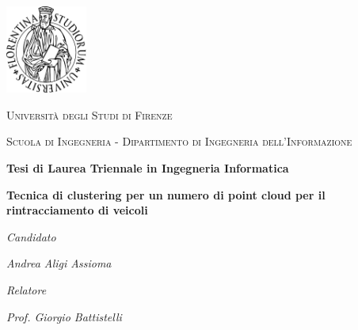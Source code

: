 \documentclass[italian]{report}
\begin{document}
\begin{titlepage}
	\centering
	\includegraphics[width=0.2\textwidth]{logo}\par\vspace{1cm}
	{\scshape\Large Università degli Studi di Firenze \par}
	\vspace{0.5cm}
	{\scshape\large Scuola di Ingegneria - Dipartimento di Ingegneria dell'Informazione \par}
	\vspace{1.5cm}
	{\textbf{Tesi di Laurea Triennale in Ingegneria Informatica} \par}
	\vspace{2cm}

	{\LARGE\bfseries Tecnica di clustering per un numero di point cloud per il rintracciamento di veicoli \par}

	\vspace{2cm}
	{\textit{Candidato} \par}
	{\itshape Andrea Aligi Assioma\par}
	\vspace{1cm}
	{\textit{Relatore} \par}
	{\itshape Prof. Giorgio Battistelli\par}
\end{titlepage}

\justifying

\tableofcontents
\newpage
\end{document}
